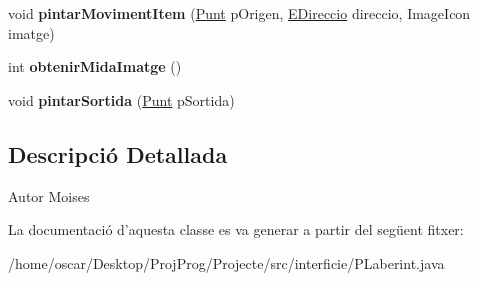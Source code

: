 \begin{DoxyCompactItemize}
\item 
\hypertarget{classinterficie_1_1_p_laberint_a3011192dc187518b6053a6216fce2b12}{void {\bfseries pintar\+Moviment\+Item} (\hyperlink{classlogica_1_1_punt}{Punt} p\+Origen, \hyperlink{enumlogica_1_1enumeracions_1_1_e_direccio}{E\+Direccio} direccio, Image\+Icon imatge)}\label{classinterficie_1_1_p_laberint_a3011192dc187518b6053a6216fce2b12}

\item 
\hypertarget{classinterficie_1_1_p_laberint_abb23147ba2f3ded4cfa8f536bdbcca09}{int {\bfseries obtenir\+Mida\+Imatge} ()}\label{classinterficie_1_1_p_laberint_abb23147ba2f3ded4cfa8f536bdbcca09}

\item 
\hypertarget{classinterficie_1_1_p_laberint_adc6caa1f1d91892ea56077d2facac8ec}{void {\bfseries pintar\+Sortida} (\hyperlink{classlogica_1_1_punt}{Punt} p\+Sortida)}\label{classinterficie_1_1_p_laberint_adc6caa1f1d91892ea56077d2facac8ec}

\end{DoxyCompactItemize}


\subsection{Descripció Detallada}
\begin{DoxyAuthor}{Autor}
Moises 
\end{DoxyAuthor}


La documentació d'aquesta classe es va generar a partir del següent fitxer\+:\begin{DoxyCompactItemize}
\item 
/home/oscar/\+Desktop/\+Proj\+Prog/\+Projecte/src/interficie/P\+Laberint.\+java\end{DoxyCompactItemize}
